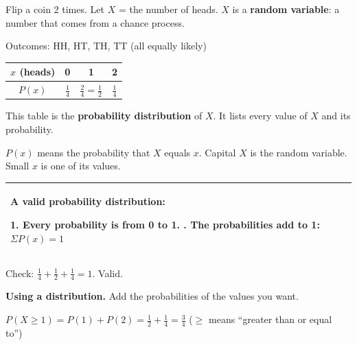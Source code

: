 \documentclass[11pt]{article}
\begin{document}

Flip a coin 2 times. Let $X$ = the number of heads. $X$ is a \textbf{random variable}: a number that comes from a chance process.

\vspace{0.4em}
\begin{minipage}[c]{0.52\linewidth}
Outcomes: HH, HT, TH, TT (all equally likely)

\vspace{0.6em}
\renewcommand{\arraystretch}{1.5}
\begin{tabular}{|c|c|c|c|}\hline
$x$ (heads) & 0 & 1 & 2 \\ \hline
$P(x)$ & $\frac{1}{4}$ & $\frac{2}{4} = \frac{1}{2}$ & $\frac{1}{4}$ \\ \hline
\end{tabular}

\vspace{0.6em}
This table is the \textbf{probability distribution} of $X$. It lists every value of $X$ and its probability.

\vspace{0.4em}
$P(x)$ means the probability that $X$ equals $x$. Capital $X$ is the random variable. Small $x$ is one of its values.
\end{minipage}\hfill
\begin{minipage}[c]{0.44\linewidth}\centering
{}
\end{minipage}

\vspace{0.8em}
\renewcommand{\arraystretch}{1.3}
\begin{tabular}{|>{\raggedright\arraybackslash}p{6.7in}|}\hline
\textbf{A valid probability distribution:}\par
1. Every probability is from 0 to 1. \qquad 2. The probabilities add to 1: \; $\Sigma P(x) = 1$\\ \hline
\end{tabular}

\vspace{0.3em}
Check: $\frac{1}{4} + \frac{1}{2} + \frac{1}{4} = 1$. \quad Valid.

\vspace{0.8em}
\textbf{Using a distribution.} Add the probabilities of the values you want.

\vspace{0.2em}
$P(X \ge 1) = P(1) + P(2) = \frac{1}{2} + \frac{1}{4} = \frac{3}{4}$ \qquad ($\ge$ means ``greater than or equal to'')
\end{document}
